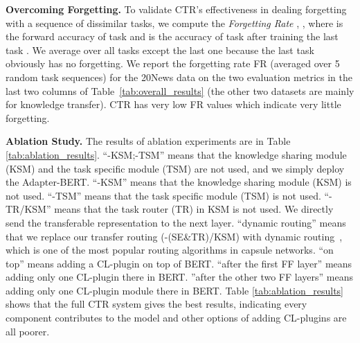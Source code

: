 \documentclass{article}
\begin{document}
{\textbf{Overcoming Forgetting.} To validate CTR's effectiveness in dealing forgetting with a sequence of dissimilar tasks, {\color{black}we compute the \textit{Forgetting Rate} \cite{DBLP:conf/cvpr/LiuSLSS20},
,
where  is the forward accuracy of task  and  is the accuracy of task  after training the last task . We average over all tasks except the last one because the last task obviously has no forgetting. {\color{black}We report the forgetting rate FR (averaged over 5 random task  sequences) for the 20News data on the two evaluation metrics in the last two columns of Table~\ref{tab:overall_results} (the other two datasets are mainly for knowledge transfer). CTR has very low FR values which indicate very little forgetting.} } 

\textbf{Ablation Study.} 
{The results of ablation experiments are in Table \ref{tab:ablation_results}. ``-KSM;-TSM'' means that the knowledge sharing module (KSM) and the task specific module (TSM) are not used, and {we simply deploy the Adapter-BERT.} ``-KSM'' means that the knowledge sharing module (KSM) is not used. ``-TSM'' means that the task specific module (TSM) is not used. {``-TR/KSM'' means that the task router (TR) in KSM is not used. We directly send the transferable representation  to the next layer. ``dynamic routing'' means that we replace our transfer routing (-(SE\&TR)/KSM) with dynamic routing~\cite{sabour2017dynamic}, which is one of the most popular routing algorithms in capsule networks.}  {\color{black}``on top'' means adding a CL-plugin on top of BERT. ``after the first FF layer'' means adding only one CL-plugin there in BERT. ''after the other two FF layers'' means adding only one CL-plugin module there in BERT.
Table \ref{tab:ablation_results} shows that the full CTR system gives the best results, indicating every component contributes to the model and other options of adding CL-plugins are all poorer.}}}
\end{document}
